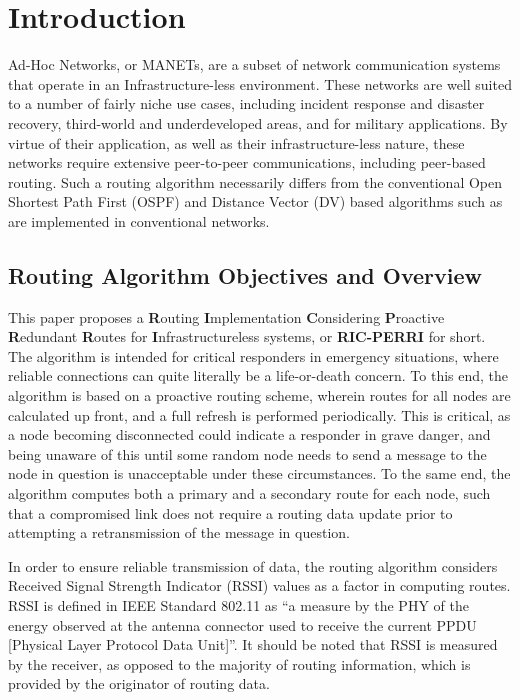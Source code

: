 \section{Introduction}\label{sec:introduction}
 Ad-Hoc Networks, or MANETs, are a subset of network communication systems that operate in an Infrastructure-less environment. These networks are well suited to a number of fairly niche use cases, including incident response and disaster recovery, third-world and underdeveloped areas, and for military applications. By virtue of their application, as well as their infrastructure-less nature, these networks require extensive peer-to-peer communications, including peer-based routing. Such a routing algorithm necessarily differs from the conventional Open Shortest Path First (OSPF) and Distance Vector (DV) based algorithms such as are implemented in conventional networks.

\subsection{Routing Algorithm Objectives and Overview}\label{subsec:objectives}

This paper proposes a \textbf{R}outing \textbf{I}mplementation \textbf{C}onsidering \textbf{P}roactive \textbf{R}edundant \textbf{R}outes for \textbf{I}nfrastructureless systems, or \textbf{RIC-PERRI} \cite{perry_rp_2022} for short. The algorithm is intended for critical responders in emergency situations, where reliable connections can quite literally be a life-or-death concern. To this end, the algorithm is based on a proactive routing scheme, wherein routes for all nodes are calculated up front, and a full refresh is performed periodically. This is critical, as a node becoming disconnected could indicate a responder in grave danger, and being unaware of this until some random node needs to send a message to the node in question is unacceptable under these circumstances. To the same end, the algorithm computes both a primary and a secondary route for each node, such that a compromised link does not require a routing data update prior to attempting a retransmission of the message in question. 

In order to ensure reliable transmission of data, the routing algorithm considers Received Signal Strength Indicator (RSSI) values as a factor in computing routes. RSSI is defined in IEEE Standard 802.11 as ``a measure by the PHY of the energy observed at the antenna connector used to receive the current PPDU [Physical Layer Protocol Data Unit]''\cite{lanman_standards_committee_80211-2020_2021}. It should be noted that RSSI is measured by the receiver, as opposed to the majority of routing information, which is provided by the originator of routing data.

